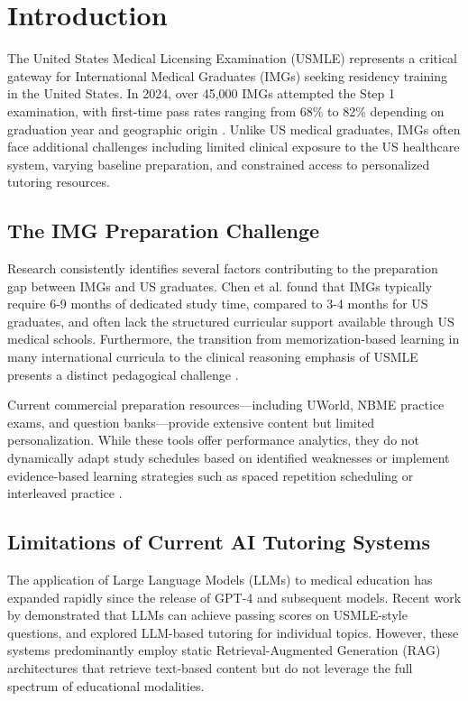 \section{Introduction}

The United States Medical Licensing Examination (USMLE) represents a critical gateway for International Medical Graduates (IMGs) seeking residency training in the United States. In 2024, over 45,000 IMGs attempted the Step 1 examination, with first-time pass rates ranging from 68\% to 82\% depending on graduation year and geographic origin \cite{fsmb2024}. Unlike US medical graduates, IMGs often face additional challenges including limited clinical exposure to the US healthcare system, varying baseline preparation, and constrained access to personalized tutoring resources.

\subsection{The IMG Preparation Challenge}

Research consistently identifies several factors contributing to the preparation gap between IMGs and US graduates. Chen et al. \cite{chen2023img} found that IMGs typically require 6-9 months of dedicated study time, compared to 3-4 months for US graduates, and often lack the structured curricular support available through US medical schools. Furthermore, the transition from memorization-based learning in many international curricula to the clinical reasoning emphasis of USMLE presents a distinct pedagogical challenge \cite{patel2024transition}.

Current commercial preparation resources—including UWorld, NBME practice exams, and question banks—provide extensive content but limited personalization. While these tools offer performance analytics, they do not dynamically adapt study schedules based on identified weaknesses or implement evidence-based learning strategies such as spaced repetition scheduling or interleaved practice \cite{artino2022testprep}.

\subsection{Limitations of Current AI Tutoring Systems}

The application of Large Language Models (LLMs) to medical education has expanded rapidly since the release of GPT-4 and subsequent models. Recent work by \cite{li2024llm} demonstrated that LLMs can achieve passing scores on USMLE-style questions, and \cite{christ2024tutoring} explored LLM-based tutoring for individual topics. However, these systems predominantly employ static Retrieval-Augmented Generation (RAG) architectures that retrieve text-based content but do not leverage the full spectrum of educational modalities.

